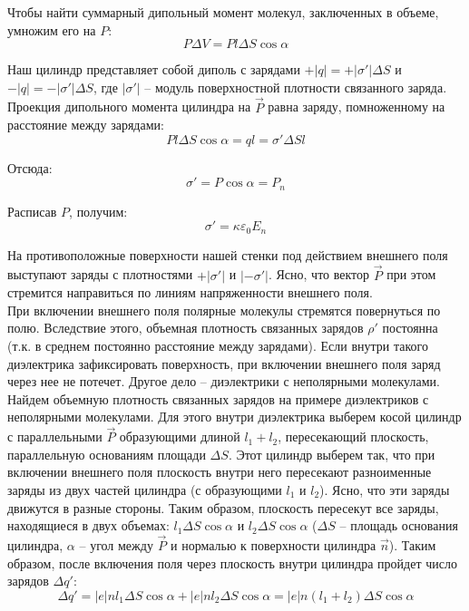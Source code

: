 \documentclass{article}
\begin{document}
	Чтобы найти суммарный дипольный момент молекул, заключенных в объеме, умножим его на $P$:
	\begin{equation}
		P\Delta V = Pl\Delta S \cos\alpha
	\end{equation}

	Наш цилиндр представляет собой диполь с зарядами $+|q|=+|\sigma'|\Delta S$ и $-|q|=-|\sigma'|\Delta S$, где $|\sigma'|$ -- модуль поверхностной плотности связанного заряда. Проекция дипольного момента цилиндра на $\vec P$ равна заряду, помноженному на расстояние между зарядами:
	\begin{equation}
		Pl\Delta S\cos\alpha = ql = \sigma'\Delta S l
	\end{equation}

	Отсюда:
	\begin{equation}
		\sigma' = P\cos\alpha = P_n
	\end{equation}

	Расписав $P$, получим:
	\begin{equation}
		\sigma' = \kappa\varepsilon_0 E_n
	\end{equation}

	На противоположные поверхности нашей стенки под действием внешнего поля выступают заряды с плотностями $+|\sigma'|$ и $|-\sigma'|$. Ясно, что вектор $\vec P$ при этом стремится направиться по линиям напряженности внешнего поля.\\

	При включении внешнего поля полярные молекулы стремятся повернуться по полю. Вследствие этого, объемная плотность связанных зарядов $\rho'$ постоянна (т.к. в среднем постоянно расстояние между зарядами). Если внутри такого диэлектрика зафиксировать поверхность, при включении внешнего поля заряд через нее не потечет. Другое дело -- диэлектрики с неполярными молекулами.\\

	Найдем объемную плотность связанных зарядов на примере диэлектриков с неполярными молекулами. Для этого внутри диэлектрика выберем косой цилиндр с параллельными $\vec P$ образующими длиной $l_1+l_2$, пересекающий плоскость, параллельную основаниям площади $\Delta S$. Этот цилиндр выберем так, что при включении внешнего поля плоскость внутри него пересекают разноименные заряды из двух частей цилиндра (с образующими $l_1$ и $l_2$). Ясно, что эти заряды движутся в разные стороны. Таким образом, плоскость пересекут все заряды, находящиеся в двух объемах: $l_1\Delta S\cos\alpha$ и $l_2\Delta S\cos\alpha$ ($\Delta S$ -- площадь основания цилиндра, $\alpha$ -- угол между $\vec P$ и нормалью к поверхности цилиндра $\vec n$). Таким образом, после включения поля через плоскость внутри цилиндра пройдет число зарядов $\Delta q'$:
	\begin{equation}
		\Delta q' = |e|nl_1\Delta S\cos\alpha + |e|nl_2\Delta S\cos\alpha = |e|n(l_1+l_2)\Delta S\cos\alpha
	\end{equation}
\end{document}

